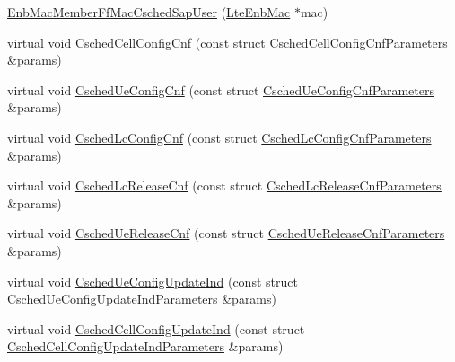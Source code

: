\begin{DoxyCompactItemize}
\item 
\hyperlink{classns3_1_1EnbMacMemberFfMacCschedSapUser_a6ab549e278a8d4320a72153b59dc7565}{Enb\+Mac\+Member\+Ff\+Mac\+Csched\+Sap\+User} (\hyperlink{classns3_1_1LteEnbMac}{Lte\+Enb\+Mac} $\ast$mac)
\item 
virtual void \hyperlink{classns3_1_1EnbMacMemberFfMacCschedSapUser_a581857ff11fa090f5cc30f39c57ed76b}{Csched\+Cell\+Config\+Cnf} (const struct \hyperlink{structns3_1_1FfMacCschedSapUser_1_1CschedCellConfigCnfParameters}{Csched\+Cell\+Config\+Cnf\+Parameters} \&params)
\item 
virtual void \hyperlink{classns3_1_1EnbMacMemberFfMacCschedSapUser_a8b0790565c42c1c8659a270cea7d6ff1}{Csched\+Ue\+Config\+Cnf} (const struct \hyperlink{structns3_1_1FfMacCschedSapUser_1_1CschedUeConfigCnfParameters}{Csched\+Ue\+Config\+Cnf\+Parameters} \&params)
\item 
virtual void \hyperlink{classns3_1_1EnbMacMemberFfMacCschedSapUser_a645b466df6eb18a5b980f66cd13dbf65}{Csched\+Lc\+Config\+Cnf} (const struct \hyperlink{structns3_1_1FfMacCschedSapUser_1_1CschedLcConfigCnfParameters}{Csched\+Lc\+Config\+Cnf\+Parameters} \&params)
\item 
virtual void \hyperlink{classns3_1_1EnbMacMemberFfMacCschedSapUser_ac2e96f4147bb9aac12d1c0ec171edc14}{Csched\+Lc\+Release\+Cnf} (const struct \hyperlink{structns3_1_1FfMacCschedSapUser_1_1CschedLcReleaseCnfParameters}{Csched\+Lc\+Release\+Cnf\+Parameters} \&params)
\item 
virtual void \hyperlink{classns3_1_1EnbMacMemberFfMacCschedSapUser_ab426d981fee26df0d6e0414ebf3b9079}{Csched\+Ue\+Release\+Cnf} (const struct \hyperlink{structns3_1_1FfMacCschedSapUser_1_1CschedUeReleaseCnfParameters}{Csched\+Ue\+Release\+Cnf\+Parameters} \&params)
\item 
virtual void \hyperlink{classns3_1_1EnbMacMemberFfMacCschedSapUser_a14a09988be135f762ec17dbdd2a30fa9}{Csched\+Ue\+Config\+Update\+Ind} (const struct \hyperlink{structns3_1_1FfMacCschedSapUser_1_1CschedUeConfigUpdateIndParameters}{Csched\+Ue\+Config\+Update\+Ind\+Parameters} \&params)
\item 
virtual void \hyperlink{classns3_1_1EnbMacMemberFfMacCschedSapUser_ad9ac8e60bf312446e4d5614b44d623d0}{Csched\+Cell\+Config\+Update\+Ind} (const struct \hyperlink{structns3_1_1FfMacCschedSapUser_1_1CschedCellConfigUpdateIndParameters}{Csched\+Cell\+Config\+Update\+Ind\+Parameters} \&params)
\end{DoxyCompactItemize}
